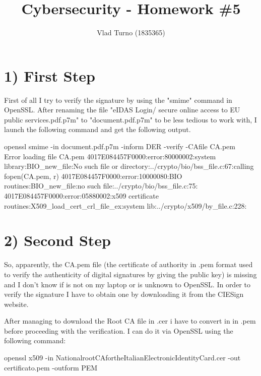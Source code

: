 \documentclass{article}
\title{Cybersecurity - Homework \#5}
\author{Vlad Turno (1835365)}
\begin{document}
\maketitle

\section*{1) First Step}
First of all I try to verify the signature by using the "smime" command in OpenSSL. After renaming the file "eIDAS Login/ secure online access to EU public services.pdf.p7m" to "document.pdf.p7m" to be less tedious to work with, I launch the following command and get the following output.\\

\begin{tcolorbox} [title=OpenSSL dialogue box]
openssl smime -in document.pdf.p7m -inform DER -verify -CAfile CA.pem\\

Error loading file CA.pem
4017E084457F0000:error:80000002:system library:BIO_new_file:No such file or directory:../crypto/bio/bss_file.c:67:calling fopen(CA.pem, r)
4017E084457F0000:error:10000080:BIO routines:BIO_new_file:no such file:../crypto/bio/bss_file.c:75:
4017E084457F0000:error:05880002:x509 certificate routines:X509_load_cert_crl_file_ex:system lib:../crypto/x509/by_file.c:228:
\end{tcolorbox}

\section*{2) Second Step}
So, apparently, the CA.pem file (the certificate of authority in .pem format used to verify the authenticity of digital signatures by giving the public key) is missing and I don't know if is not on my laptop or is unknown to OpenSSL. In order to verify the signature I have to obtain one by downloading it from the CIESign website.

After managing to download the Root CA file in .cer i have to convert in in .pem before proceeding with the verification. I can do it via OpenSSL using the following command:\\

\begin{tcolorbox} [title=OpenSSL dialogue box]
openssl x509 -in NationalrootCAfortheItalianElectronicIdentityCard.cer -out certificato.pem -outform PEM
\end{tcolorbox}
\end{document}

